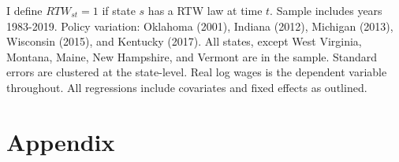 \documentclass[11pt]{article}
\begin{document}
{\pagebreak
\begin{landscape}
\small{}
\footnotesize{I define $RTW_{st} = 1$ if state $s$ has a RTW law at time $t$. Sample includes years 1983-2019. Policy variation: Oklahoma (2001), Indiana (2012), Michigan (2013), Wisconsin (2015), and Kentucky (2017). All states, except West Virginia, Montana, Maine, New Hampshire, and Vermont are in the sample. Standard errors are clustered at the state-level. Real log wages is the dependent variable throughout. All regressions include covariates and fixed effects as outlined.}
\end{landscape}
}
\pagebreak
{}
\doublespacing
\appendix
\section{Appendix}
\end{document}
